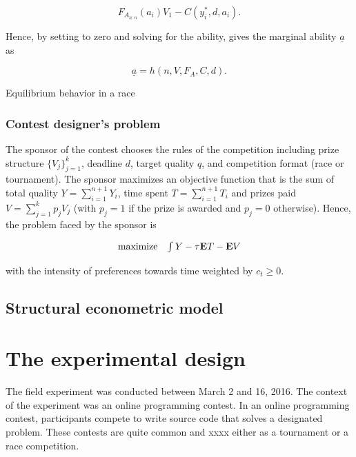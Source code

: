 \documentclass[12pt,]{article}
\begin{document}
\[\label{eq: expected payoffs tournament}
  {F_{A_{n:n}}}(a_i) V_1  - C(y_i^*, d, a_i).\]

Hence, by setting to zero and solving for the ability, gives the
marginal ability \({\underline a}\) as

\[{\underline a}= h(n, V, F_A, C, d).\]

\begin{corollary}

Equilibrium behavior in a race

\end{corollary}

\subsubsection{Contest designer's
problem}\label{contest-designers-problem}

The sponsor of the contest chooses the rules of the competition
including prize structure \(\{V_j\}_{j=1}^k\), deadline \(d\), target
quality \(q\), and competition format (race or tournament). The sponsor
maximizes an objective function that is the sum of total quality
\(Y=\sum_{i=1}^{n+1} Y_i\), time spent \(T=\sum_{i=1}^{n+1} T_i\) and
prizes paid \(V=\sum_{j=1}^k p_{j} V_j\) (with \(p_j=1\) if the prize is
awarded and \(p_j=0\) otherwise). Hence, the problem faced by the
sponsor is

\[\begin{array}{ll}
    \mbox{maximize} & \int {Y}   -  {\tau}{{\bf E}}{T} - {{\bf E}}{V}
  \end{array}\]

with the intensity of preferences towards time weighted by
\(c_t\geq 0\).

\subsection{Structural econometric
model}\label{structural-econometric-model}

\section{The experimental design}\label{the-experimental-design}

The field experiment was conducted between March 2 and 16, 2016. The
context of the experiment was an online programming contest. In an
online programming contest, participants compete to write source code
that solves a designated problem. These contests are quite common and
xxxx either as a tournament or a race competition.
\end{document}
